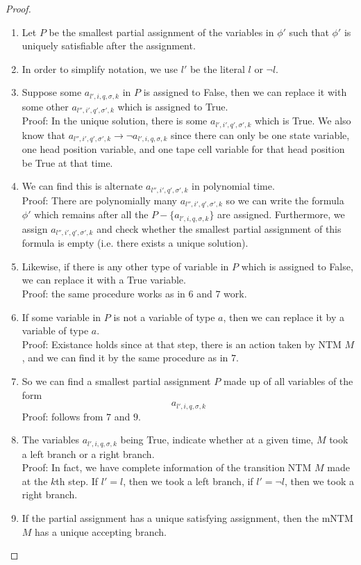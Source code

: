 \documentclass[runningheads,a4paper]{llncs}
\begin{document}
\begin{proof}
\begin{enumerate}
\item Let $P$ be the smallest partial assignment of the variables in $\phi'$ such that $\phi'$ is uniquely satisfiable after the assignment.
\item In order to simplify notation, we use $l'$ be the literal $l$ or $\neg l$.
\item Suppose some $a_{l', i, q, \sigma, k}$ in $P$ is assigned to False, then we can replace it with some other $a_{l'', i', q', \sigma', k}$ which is assigned to True. \\
Proof: In the unique solution, there is some $a_{l', i', q', \sigma', k}$ which is True. We also know that $a_{l'', i',q',\sigma',k} \rightarrow \neg a_{l',i, q, \sigma, k}$ since there can only be one state variable, one head position variable, and one tape cell variable for that head position be True at that time. 
\item We can find this is alternate $a_{l'', i', q', \sigma', k}$ in polynomial time.\\
Proof: There are polynomially many $a_{l'', i',q',\sigma',k}$ so we can write the formula $\phi'$ which remains after all the $P - \{a_{l', i, q, \sigma, k}\}$ are assigned. Furthermore, we assign $a_{l'', i', q',\sigma', k}$ and check whether the smallest partial assignment of this formula is empty (i.e. there exists a unique solution).
\item Likewise, if there is any other type of variable in $P$ which is assigned to False, we can replace it with a True variable.\\
Proof: the same procedure works as in $6$ and $7$ work.
\item If some variable in $P$ is not a variable of type $a$, then we can replace it by a variable of type $a$.\\
Proof: Existance holds since at that step, there is an action taken by NTM $M$, and we can find it by the same procedure as in $7$. 
\item So we can find a smallest partial assignment $P$ made up of all variables of the form 
\[ a_{l', i,q,\sigma, k} \]
Proof: follows from $7$ and $9$.
\item The variables $a_{l', i,q,\sigma, k}$ being True, indicate whether at a given time, $M$ took a left branch or a right branch.\\
Proof: In fact, we have complete information of the transition NTM $M$ made at the $k$th step. If $l' = l$, then we took a left branch, if $l' = \neg l$, then we took a right branch.
\item If the partial assignment has a unique satisfying assignment, then the mNTM $M$ has a unique accepting branch. \\

\end{enumerate}
\end{proof}
\end{document}
